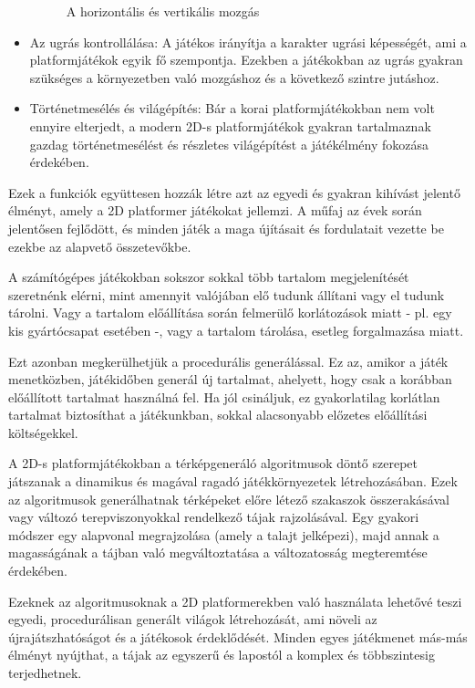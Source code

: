 \begin{itemize}
\begin{figure}[ht]
\caption{A horizontális és vertikális mozgás}
\label{fig:horvermovement}
\end{figure}
\item Az ugrás kontrollálása: A játékos irányítja a karakter ugrási képességét, ami a platformjátékok egyik fő szempontja. Ezekben a játékokban az ugrás gyakran szükséges a környezetben való mozgáshoz és a következő szintre jutáshoz.\cite{platformerfeature}
\item Történetmesélés és világépítés: Bár a korai platformjátékokban nem volt ennyire elterjedt, a modern 2D-s platformjátékok gyakran tartalmaznak gazdag történetmesélést és részletes világépítést a játékélmény fokozása érdekében.\cite{platformerfeature}
\end{itemize}
Ezek a funkciók együttesen hozzák létre azt az egyedi és gyakran kihívást jelentő élményt, amely a 2D platformer játékokat jellemzi. A műfaj az évek során jelentősen fejlődött, és minden játék a maga újításait és fordulatait vezette be ezekbe az alapvető összetevőkbe.


A számítógépes játékokban sokszor sokkal több tartalom megjelenítését szeretnénk elérni, mint amennyit valójában elő tudunk állítani vagy el tudunk tárolni. Vagy a tartalom előállítása során felmerülő korlátozások miatt - pl. egy kis gyártócsapat esetében -, vagy a tartalom tárolása, esetleg forgalmazása miatt. \cite{platformerconnection}

Ezt azonban megkerülhetjük a procedurális generálással. Ez az, amikor a játék menetközben, játékidőben generál új tartalmat, ahelyett, hogy csak a korábban előállított tartalmat használná fel. Ha jól csináljuk, ez gyakorlatilag korlátlan tartalmat biztosíthat a játékunkban, sokkal alacsonyabb előzetes előállítási költségekkel.\cite{platformerconnection}

A 2D-s platformjátékokban a térképgeneráló algoritmusok döntő szerepet játszanak a dinamikus és magával ragadó játékkörnyezetek létrehozásában. Ezek az algoritmusok generálhatnak térképeket előre létező szakaszok összerakásával vagy változó terepviszonyokkal rendelkező tájak rajzolásával. Egy gyakori módszer egy alapvonal megrajzolása (amely a talajt jelképezi), majd annak a magasságának a tájban való megváltoztatása a változatosság megteremtése érdekében.\cite{platformerconnection}

Ezeknek az algoritmusoknak a 2D platformerekben való használata lehetővé teszi egyedi, procedurálisan generált világok létrehozását, ami növeli az újrajátszhatóságot és a játékosok érdeklődését. Minden egyes játékmenet más-más élményt nyújthat, a tájak az egyszerű és lapostól a komplex és többszintesig terjedhetnek.\cite{platformerconnection}

